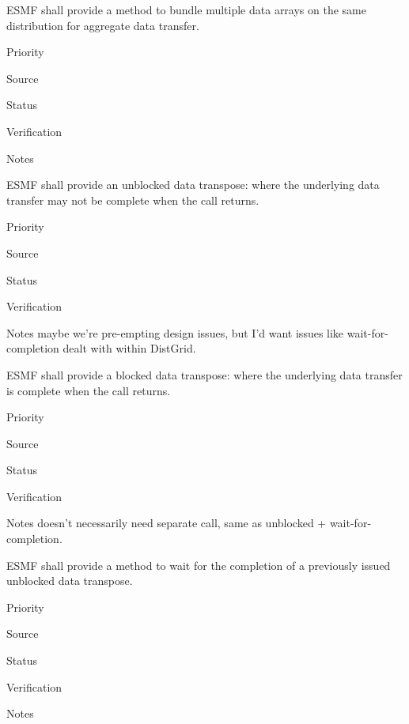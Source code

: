 
ESMF shall provide a method to bundle multiple data arrays on the same
distribution for aggregate data transfer.

\begin{reqlist}
\item[Priority]
\item[Source]
\item[Status]
\item[Verification]
\item[Notes]
\end{reqlist}



ESMF shall provide an unblocked data transpose: where the underlying
data transfer may not be complete when the call returns.

\begin{reqlist}
\item[Priority]
\item[Source]
\item[Status]
\item[Verification]
\item[Notes] maybe we're pre-empting design issues, but I'd want
  issues like wait-for-completion dealt with within DistGrid.
\end{reqlist}


ESMF shall provide a blocked data transpose: where the underlying
data transfer is complete when the call returns.

\begin{reqlist}
\item[Priority]
\item[Source]
\item[Status]
\item[Verification]
\item[Notes] doesn't necessarily need separate call, same as unblocked
  + wait-for-completion.
\end{reqlist}


ESMF shall provide a method to wait for the completion of a previously
issued unblocked data transpose.

\begin{reqlist}
\item[Priority]
\item[Source]
\item[Status]
\item[Verification]
\item[Notes]
\end{reqlist}


